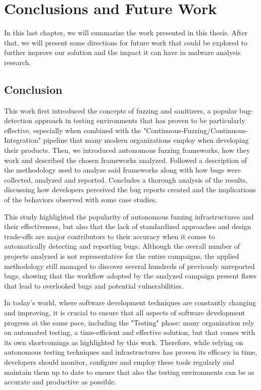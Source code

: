 \chapter{Conclusions and Future Work} \label{chap_5}

In this last chapter, we will summarize the work presented in this thesis. After that, we will present some directions for future work that could be explored to further improve our solution and the impact it can have in malware analysis research.

\section{Conclusion}
This work first introduced the concepts of fuzzing and sanitizers, a popular bug-detection approach in testing environments that has proven to be particularly effective, especially when combined with the "Continuous-Fuzzing/Continuous-Integration" pipeline that many modern organizations employ when developing their products. Then, we introduced autonomous fuzzing frameworks, how they work and described the chosen frameworks analyzed. Followed a description of the methodology used to analyze said frameworks along with how bugs were collected, analyzed and reported. Concludes a thorough analysis of the results, discussing how developers perceived the bug reports created and the implications of the behaviors observed with some case studies.

This study highlighted the popularity of autonomous fuzzing infrastructures and their effectiveness, but also that the lack of standardized approaches and design trade-offs are major contributors to their accuracy when it comes to automatically detecting and reporting bugs. Although the overall number of projects analyzed is not representative for the entire campaigns, the applied methodology still managed to discover several hundreds of previously unreported bugs, showing that the workflow adopted by the analyzed campaign present flaws that lead to overlooked bugs and potential vulnerabilities.

In today's world, where software development techniques are constantly changing and improving, it is crucial to ensure that all aspects of software development progress at the same pace, including the "Testing" phase: many organization rely on automated testing, a time-efficient and effective solution, but that comes with its own shortcomings as highlighted by this work. Therefore, while relying on autonomous testing techniques and infrastructures has proven its efficacy in time, developers should monitor, configure and employ these tools regularly and maintain them up to date to ensure that also the testing environments can be as accurate and productive as possible.


